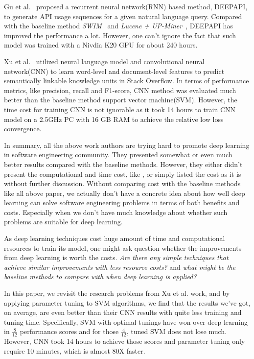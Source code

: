 Gu et al.~\cite{gu2016deep} proposed  a recurrent neural network(RNN)
 based method, D{\scriptsize EEP}API, to generate API usage sequences for a given natural language query. 
 Compared with the baseline method {\it SWIM}~\cite{raghothaman2016swim} and 
 {\it Lucene + UP-Miner}~\cite{wang2013mining},  D{\scriptsize EEP}API has improved the performance a lot.
 However, one can't ignore the fact that such model was trained with a Nivdia K20 GPU for about 240 hours.
 
 Xu et al.~\cite{xu2016predicting} utilized neural language model and  
 convolutional neural network(CNN) to  learn word-level and document-level features to
 predict semantically linkable knowledge units in Stack Overflow. 
 In terms of performance metrics, like precision, recall and F1-score,
 CNN method was evaluated much better than 
 the baseline method support vector machine(SVM). 
 However, the time cost for training CNN is not ignorable as it took
 14 hours to train CNN model on a 2.5GHz PC with 16 GB RAM 
 to achieve the relative low loss convergence.
 
 In summary, all the above work authors are trying hard to promote deep learning in software
 engineering community. They presented somewhat or even much better results compared with
 the baseline methods. However, they either didn't present the computational and time cost, like \cite{white2016deep,white2015toward,lam2015combining,choetkiertikul2016deep}, or simply listed
 the cost as it is without further discussion\cite{wang2016automatically, gu2016deep, xu2016predicting}. Without comparing cost with the baseline methods like all above paper,
 we actually don't have a concrete idea about how well deep learning can solve software engineering problems in terms of both benefits and costs. Especially when we don't have much knowledge about
 whether such problems are suitable for deep learning. 
 
As deep learning techniques cost huge amount of time and computational
resources to train its model,
one might ask question whether the improvements from deep learning is worth
the costs. {\it Are there any simple techniques that achieve similar improvements
with less resource costs?} and {\it what might be the baseline methods to compare with
when deep learning is applied?}

In this paper, we revisit the research problems 
from Xu et al.\cite{xu2016predicting} work, and by applying parameter tuning 
to SVM algorithms, we find that the results we've got, on average, are even 
better than their CNN results with quite less training and tuning time.
Specifically, SVM with optimal tunings have won over deep learning 
in $\frac{8}{12}$ performance scores and for those $\frac{4}{12}$,
tuned SVM  does not lose much. However, CNN took 14 hours to achieve
those scores and parameter tuning only require 10 minutes, which is almost 80X faster.




